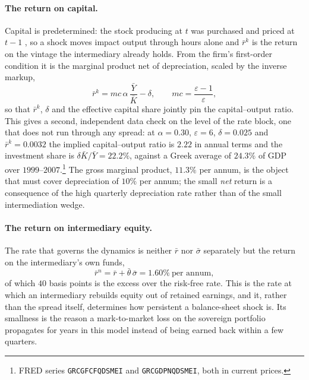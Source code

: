 \paragraph{The return on capital.}
Capital is predetermined: the stock producing at $t$ was purchased and priced at
$t-1$ \citep[eq.~6]{bocola2016}, so a shock moves impact output through hours
alone and $\bar r^{k}$ is the return on the vintage the intermediary already
holds. From the firm's first-order condition it is the marginal product net of
depreciation, scaled by the inverse markup,
\begin{equation}
\bar r^{k}=\mathit{mc}\,\alpha\,\frac{\bar Y}{\bar K}-\delta,
\qquad \mathit{mc}=\frac{\varepsilon-1}{\varepsilon},
\label{eq:rk-foc}
\end{equation}
so that $\bar r^{k}$, $\delta$ and the effective capital share jointly pin the
capital--output ratio. This gives a second, independent data check on the level
of the rate block, one that does not run through any spread: at
$\alpha=0.30$, $\varepsilon=6$, $\delta=0.025$ and $\bar r^{k}=0.0032$ the
implied capital--output ratio is $2.22$ in annual terms and the investment share
is $\delta\bar K/\bar Y=22.2\%$, against a Greek average of $24.3\%$ of GDP over
$1999$--$2007$.\footnote{FRED series \texttt{GRCGFCFQDSMEI} and
\texttt{GRCGDPNQDSMEI}, both in current prices.} The gross marginal product,
$11.3\%$ per annum, is the object that must cover depreciation of $10\%$ per
annum; the small \emph{net} return is a consequence of the high quarterly
depreciation rate rather than of the small intermediation wedge.

\paragraph{The return on intermediary equity.}
The rate that governs the dynamics is neither $\bar r$ nor $\bar\sigma$
separately but the return on the intermediary's own funds,
\begin{equation}
\bar r^{n}=\bar r+\bar\theta\,\bar\sigma=1.60\%\ \text{per annum},
\label{eq:roe}
\end{equation}
of which $40$ basis points is the excess over the risk-free rate. This is the
rate at which an intermediary rebuilds equity out of retained earnings, and it,
rather than the spread itself, determines how persistent a balance-sheet shock
is. Its smallness is the reason a mark-to-market loss on the sovereign portfolio
propagates for years in this model instead of being earned back within a few
quarters.

